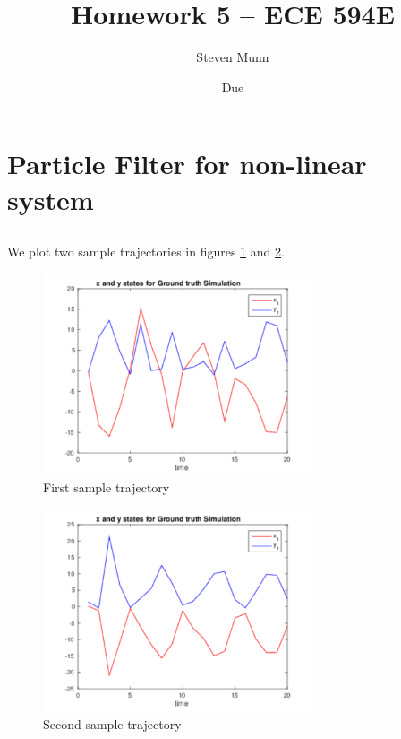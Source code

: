 \documentclass[11pt]{article}
\title{Homework 5 -- ECE 594E}
\author{Steven Munn}
\date{Due \displaydate{date}}
\begin{document}
\maketitle

\section{Particle Filter for non-linear system}
\subsection{}

We plot two sample trajectories in figures \ref{st1} and \ref{st2}.

\begin{figure}[h]
  
  \centering
    \includegraphics[width=80mm]{../figs/001_11_sampletraj1.pdf}
    \caption{First sample trajectory}
    \label{st1}
\end{figure}

\begin{figure}[h]
  
  \centering
    \includegraphics[width=80mm]{../figs/002_11_sampletraj2.pdf}
    \caption{Second sample trajectory}
    \label{st2}
\end{figure}

\subsection{}
\end{document}
